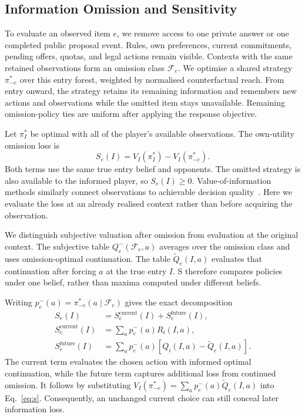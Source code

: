 \documentclass[11pt,a4paper]{article}
\begin{document}
\subsection{Information Omission and Sensitivity}
To evaluate an observed item $e$, we remove access to one private answer
or one completed public proposal event. Rules, own preferences, current
commitments, pending offers, quotas, and legal actions remain visible.
Contexts with the same retained observations form an omission class
$\mathcal F_e$. We optimise a shared strategy $\pi_{-e}^*$ over this entry
forest, weighted by normalised counterfactual reach. From entry onward,
the strategy retains its remaining information and remembers new actions
and observations while the omitted item stays unavailable. Remaining
omission-policy ties are uniform after applying the response objective.

Let $\pi_I^*$ be optimal with all of the player's available observations.
The own-utility omission loss is
\begin{equation}
 S_e(I)=V_I(\pi_I^*)-V_I(\pi_{-e}^*).
 \label{eq:s}
\end{equation}
Both terms use the same true entry belief and opponents. The omitted
strategy is also available to the informed player, so $S_e(I)\geq0$.
Value-of-information methods similarly connect observations to achievable
decision quality~\cite{chen2017voi}. Here we evaluate the loss at an already realised
context rather than before acquiring the observation.

We distinguish subjective valuation after omission from evaluation at
the original context. The subjective
table $Q_e^-(\mathcal F_e,a)$ averages over the omission class and uses
omission-optimal continuation. The table $\widetilde Q_e(I,a)$ evaluates
that continuation after forcing $a$ at the true entry $I$. S therefore
compares policies under one belief, rather than maxima computed under
different beliefs.

Writing $p_e^-(a)=\pi_{-e}^*(a\mid\mathcal F_e)$ gives the exact decomposition
\begin{align}
 S_e(I)&=S_e^{\mathrm{current}}(I)+S_e^{\mathrm{future}}(I),
 \label{eq:s-decomp}\\
 S_e^{\mathrm{current}}(I)&=\sum_a p_e^-(a)R_i(I,a),\\
 S_e^{\mathrm{future}}(I)&=\sum_a p_e^-(a)
                      [Q_i(I,a)-\widetilde Q_e(I,a)].
\end{align}
The current term evaluates the chosen action with informed optimal
continuation, while the future term captures additional loss from continued
omission. It follows by substituting
$V_I(\pi_{-e}^*)=\sum_a p_e^-(a)\widetilde Q_e(I,a)$ into
Eq.~\ref{eq:s}. Consequently, an unchanged current choice can still conceal
later information loss.
\end{document}
